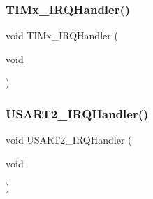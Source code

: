 \subsubsection{T\+I\+Mx\+\_\+\+I\+R\+Q\+Handler()}
{\footnotesize\ttfamily void T\+I\+Mx\+\_\+\+I\+R\+Q\+Handler (\begin{DoxyParamCaption}\item[{void}]{ }\end{DoxyParamCaption})}

\mbox{\label{stm32f3xx__it_8h_a0ca6fd0e6f77921dd1123539857ba0a8}} 
\subsubsection{U\+S\+A\+R\+T2\+\_\+\+I\+R\+Q\+Handler()}
{\footnotesize\ttfamily void U\+S\+A\+R\+T2\+\_\+\+I\+R\+Q\+Handler (\begin{DoxyParamCaption}\item[{void}]{ }\end{DoxyParamCaption})}

